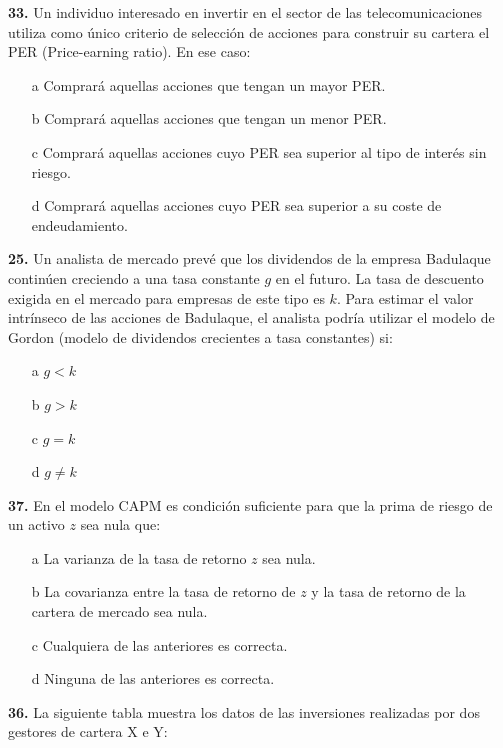 \documentclass{nuevotema}
\begin{document}

\textbf{33.} Un individuo interesado en invertir en el sector de las telecomunicaciones utiliza como único criterio de selección de acciones para construir su cartera el PER (Price-earning ratio). En ese caso:

\begin{itemize}
	\item[a] Comprará aquellas acciones que tengan un mayor PER.
	\item[b] Comprará aquellas acciones que tengan un menor PER.
	\item[c] Comprará aquellas acciones cuyo PER sea superior al tipo de interés sin riesgo.
	\item[d] Comprará aquellas acciones cuyo PER sea superior a su coste de endeudamiento.
\end{itemize}


\textbf{25.} Un analista de mercado prevé que los dividendos de la empresa Badulaque continúen creciendo a una tasa constante $g$ en el futuro. La tasa de descuento exigida en el mercado para empresas de este tipo es $k$. Para estimar el valor intrínseco de las acciones de Badulaque, el analista podría utilizar el modelo de Gordon (modelo de dividendos crecientes a tasa constantes) si:

\begin{itemize}
	\item[a] $g < k$
	\item[b] $g > k$
	\item[c] $g = k$
	\item[d] $g \neq k$
\end{itemize}

\textbf{37.} En el modelo CAPM es condición suficiente para que la prima de riesgo de un activo $z$ sea nula que:
\begin{enumerate}
	\item[a] La varianza de la tasa de retorno $z$ sea nula.
	\item[b] La covarianza entre la tasa de retorno de $z$ y la tasa de retorno de la cartera de mercado sea nula.
	\item[c] Cualquiera de las anteriores es correcta.
	\item[d] Ninguna de las anteriores es correcta. 
\end{enumerate}

\textbf{36.} La siguiente tabla muestra los datos de las inversiones realizadas por dos gestores de cartera X e Y:
\end{document}
